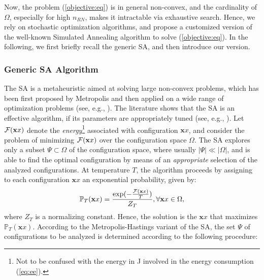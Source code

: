 \documentclass[draftcls,onecolumn]{IEEEtran}
\theoremstyle{plain}
\theoremstyle{definition}
\def\config{\mathbf{x}}
\def\augmented{{\cal F}}
\def\augmented{{\cal F}}
\begin{document}
Now, the problem (\ref{objective:eq}) is in general non-convex, and the cardinality of $\Omega$, especially for high $n_{RN}$, makes it intractable via exhaustive search. Hence, we rely on stochastic optimization algorithms, and propose a customized version of the well-known Simulated Annealing algorithm to solve (\ref{objective:eq}). In the following, we first briefly recall the generic SA, and then introduce our version.

\subsubsection{Generic SA Algorithm} 
The SA is a metaheuristic aimed at solving large non-convex problems, which has been first proposed by Metropolis \cite{Metropolis1953} and then applied on a wide range of optimization problems (see, e.g., \cite{Kirkpatrick1983,Keung2010}). The literature shows that the SA is an effective algorithm, if its parameters are appropriately tuned (see, e.g., \cite{Roubini99}). Let $\augmented(\config{x})$ denote the {\it energy}\footnote{Not to be confused with the energy in J involved in the energy consumption (\ref{eq:ee}).} associated with configuration $\config{x}$, and consider the problem of minimizing $\augmented(\config{x})$ over the configuration space $\Omega$. 
The SA explores only a subset $\Psi \subset \Omega$ of the configuration space, where usually $|\Psi| \ll |\Omega|$, and is able to find the optimal configuration by means of an {\it appropriate} selection of the analyzed configurations. At temperature $T$, the algorithm proceeds by assigning to each configuration $\config{x}$ an exponential probability, given by:
\begin{equation} \label{eq:probaexp}
     \mathbb{P}_T(\config{x})= \frac{ \exp(-\frac{\augmented(\config{x})}{T})}{Z_T}, \forall \config{x} \in \Omega,
\end{equation} 
where $Z_T$ is a normalizing constant. 
Hence, the solution is the $\config{x}$ that maximizes $\mathbb{P}_T(\config{x})$. According to the Metropolis-Hastings variant \cite{Hastings1970} of the SA, the set $\Psi$ of configurations to be analyzed is determined according to the following procedure: 
\end{document}
